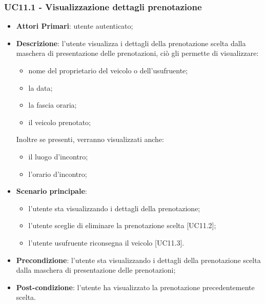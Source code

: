  \subsubsection{UC11.1 - Visualizzazione dettagli prenotazione}
\begin{itemize}
	\item \textbf{Attori Primari}: utente autenticato;
	\item \textbf{Descrizione}: l'utente visualizza i dettagli della prenotazione scelta dalla maschera di presentazione delle prenotazioni, ciò gli permette di visualizzare:
	\begin{itemize}
		\item nome del proprietario del veicolo o dell'usufruente;
		\item la data;
		\item la fascia oraria;
		\item il veicolo prenotato;
	\end{itemize}
	Inoltre se presenti, verranno visualizzati anche:
	\begin{itemize}		
		\item il luogo d'incontro;
		\item l'orario d'incontro;
	\end{itemize}
	\item \textbf{Scenario principale}:
	\begin{itemize}
		\item l'utente sta visualizzando i dettagli della prenotazione;
		\item l'utente sceglie di eliminare la prenotazione scelta [UC11.2];
		\item l'utente usufruente riconsegna il veicolo [UC11.3].
	\end{itemize}
	\item \textbf{Precondizione}: l'utente sta visualizzando i dettagli della prenotazione scelta dalla maschera di presentazione delle prenotazioni;
	\item \textbf{Post-condizione}: l'utente ha visualizzato la prenotazione precedentemente scelta.
\end{itemize}
